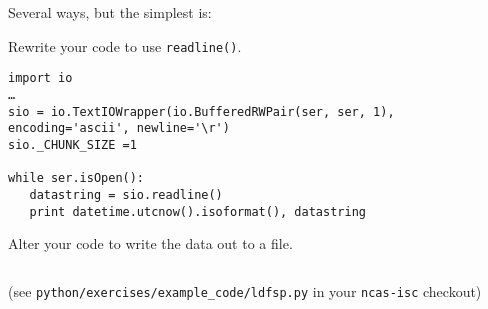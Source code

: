 \documentclass[a4paper,11pt]{article}
\begin{document}
\begin{solution}
Several ways, but the simplest is:

\noindent\usebox\serloop

\end{solution}

\begin{question}
Rewrite your code to use \texttt{readline()}.
\end{question}
\newsavebox\readlinebox
\begin{lrbox}{\readlinebox}
\begin{minipage}{\textwidth}
\begin{verbatim}
import io
…
sio = io.TextIOWrapper(io.BufferedRWPair(ser, ser, 1), encoding='ascii', newline='\r')
sio._CHUNK_SIZE =1

while ser.isOpen():
   datastring = sio.readline()
   print datetime.utcnow().isoformat(), datastring
\end{verbatim}
\end{minipage}
\end{lrbox}

\begin{solution}
\noindent\usebox\readlinebox
\end{solution}
\begin{question}
Alter your code to write the data out to a file.
\end{question}

\newsavebox\logfile
\begin{lrbox}{\logfile}
\begin{minipage}{\textwidth}
\inputminted[bgcolor=lightyellow]{python}{../../../python/exercises/example_code/ldfsp.py}
\end{minipage}
\end{lrbox}
\begin{solution}
(see \texttt{python/exercises/example\_code/ldfsp.py} in your \texttt{ncas-isc} checkout)
\end{solution}
\newpage
\printsolutions
\newpage
\end{document}
